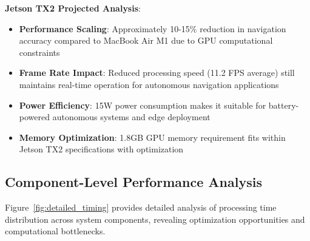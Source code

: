 \documentclass[10pt]{article}
\newcommand{\figref}[1]{Figure~\ref{#1}}
\begin{document}
\begin{table}[ht]
\centering
\caption{Projected NVIDIA Jetson TX2 Performance Analysis}
\label{tab:jetson_projected_performance}
\end{table}

\textbf{Jetson TX2 Projected Analysis}:
\begin{itemize}
\item \textbf{Performance Scaling}: Approximately 10-15\% reduction in navigation accuracy compared to MacBook Air M1 due to GPU computational constraints
\item \textbf{Frame Rate Impact}: Reduced processing speed (11.2 FPS average) still maintains real-time operation for autonomous navigation applications
\item \textbf{Power Efficiency}: 15W power consumption makes it suitable for battery-powered autonomous systems and edge deployment
\item \textbf{Memory Optimization}: 1.8GB GPU memory requirement fits within Jetson TX2 specifications with optimization
\end{itemize}

\subsection{Component-Level Performance Analysis}

\figref{fig:detailed_timing} provides detailed analysis of processing time distribution across system components, revealing optimization opportunities and computational bottlenecks.
\end{document}
